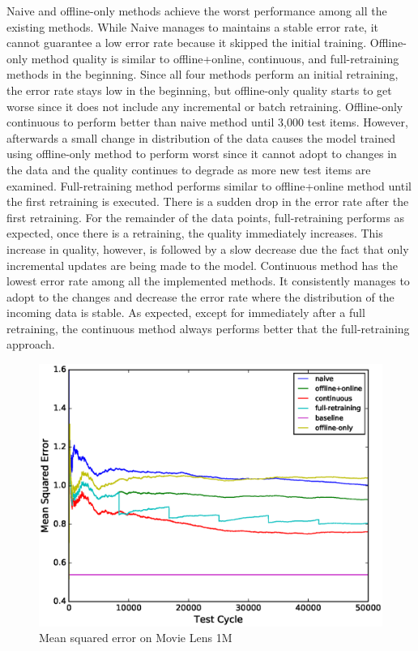 \documentclass{sig-alternate-05-2015}
\begin{document}
Naive and offline-only methods achieve the worst performance among all the existing methods.
While Naive manages to maintains a stable error rate, it cannot guarantee a low error rate because it skipped the initial training.
Offline-only method quality is similar to offline+online, continuous, and full-retraining methods in the beginning. 
Since all four methods perform an initial retraining, the error rate stays low in the beginning, but offline-only quality starts to get worse since it does not include any incremental or batch retraining.
Offline-only continuous to perform better than naive method until 3,000 test items.
However, afterwards a small change in distribution of the data causes the model trained using offline-only method to perform worst since it cannot adopt to changes in the data and the quality continues to degrade as more new test items are examined.
Full-retraining method performs similar to offline+online method until the first retraining is executed.
There is a sudden drop in the error rate after the first retraining.
For the remainder of the data points, full-retraining performs as expected, once there is a retraining, the quality immediately increases.
This increase in quality, however, is followed by a slow decrease due the fact that only incremental updates are being made to the model.
Continuous method has the lowest error rate among all the implemented methods.
It consistently manages to adopt to the changes and decrease the error rate where the distribution of the incoming data is stable.
As expected, except for immediately after a full retraining, the continuous method always performs better that the full-retraining approach.

\begin{figure}[h]
\centering
\includegraphics[width=\columnwidth]{../images/experiment-results/movie-lens-1m-quality.eps}
\caption{Mean squared error on Movie Lens 1M}
\label{fig:movie-lens-1M-score}
\end{figure}
\end{document}
